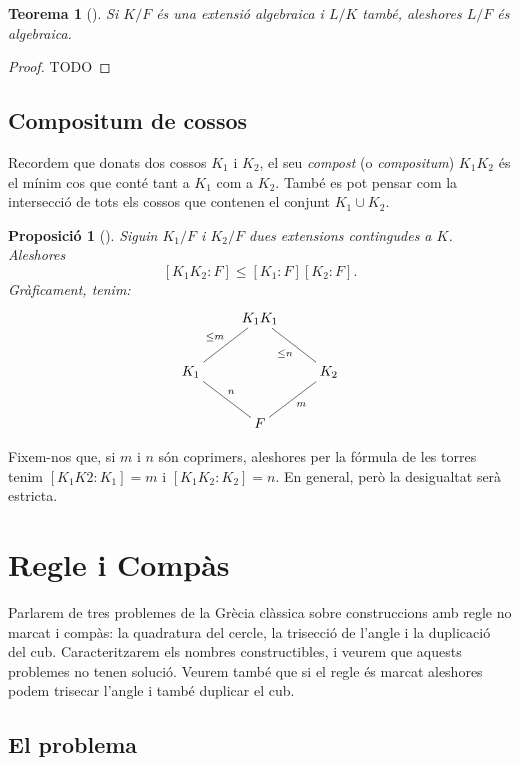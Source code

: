\documentclass[
]{book}
\newtheorem{theorem}{Teorema}[chapter]
\newtheorem{proposition}{Proposició}[chapter]
\theoremstyle{definition}
\theoremstyle{definition}
\theoremstyle{definition}
\theoremstyle{definition}
\theoremstyle{remark}
\begin{document}
\begin{theorem}[]
Si \(K/F\) és una extensió algebraica i \(L/K\) també, aleshores \(L/F\) és algebraica.
\end{theorem}

\begin{proof}
TODO
\end{proof}

\hypertarget{compositum-de-cossos}{%
\section{Compositum de cossos}\label{compositum-de-cossos}}

Recordem que donats dos cossos \(K_1\) i \(K_2\), el seu \emph{compost} (o \emph{compositum}) \(K_1K_2\) és el mínim cos que conté
tant a \(K_1\) com a \(K_2\). També es pot pensar com la intersecció de tots els cossos que contenen el conjunt \(K_1\cup K_2\).

\begin{proposition}[]
Siguin \(K_1/F\) i \(K_2/F\) dues extensions contingudes a \(K\). Aleshores
\[
[K_1K_2\colon F] \leq [K_1\colon F] [K_2 \colon F].
\]
Gràficament, tenim:
\[
\begin{xy}
\xymatrix{
  & K_1 K_1 \\
  K_1\ar@{-}^{\leq m}[ur]\ar@{-}^{n}[dr] &&K_2\ar@{-}[ul]^{\leq n}\ar@{-}[dl]^{m}\\
  &F
}
\end{xy}
\]
\end{proposition}

Fixem-nos que, si \(m\) i \(n\) són coprimers, aleshores per la fórmula de les torres tenim \([K_1K2\colon K_1]=m\) i \([K_1K_2\colon K_2]=n\).
En general, però la desigualtat serà estricta.

\hypertarget{regle-i-compuxe0s}{%
\chapter{Regle i Compàs}\label{regle-i-compuxe0s}}

Parlarem de tres problemes de la Grècia clàssica sobre construccions amb regle no marcat i compàs: la quadratura del cercle,
la trisecció de l'angle i la duplicació del cub. Caracteritzarem els nombres constructibles, i veurem que aquests problemes
no tenen solució. Veurem també que si el regle és marcat aleshores podem trisecar l'angle i també duplicar el cub.

\hypertarget{el-problema}{%
\section{El problema}\label{el-problema}}
\end{document}
